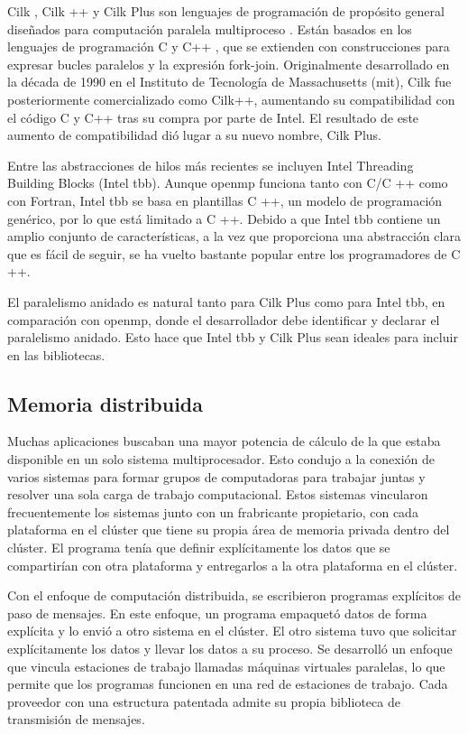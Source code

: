 Cilk \cite{robison2012cilk}, Cilk ++ y Cilk Plus \cite{blumofe1995cilk} son lenguajes de programación de propósito general diseñados para computación paralela multiproceso . Están basados en los lenguajes de programación C y C++ , que se extienden con construcciones para expresar bucles paralelos y la expresión fork-join. Originalmente desarrollado en la década de 1990 en el Instituto de Tecnología de Massachusetts (\acrshort{mit}), Cilk fue posteriormente comercializado como Cilk++, aumentando su compatibilidad con el código C y C++ tras su compra por parte de Intel. El resultado de este aumento de compatibilidad dió lugar a su nuevo nombre, Cilk Plus.

Entre las abstracciones de hilos más recientes se incluyen Intel Threading Building Blocks (Intel \acrshort{tbb})\cite{inteltbb2008}. Aunque \acrshort{openmp} funciona tanto con C/C ++ como con Fortran, Intel \acrshort{tbb} se basa en plantillas C ++, un modelo de programación genérico, por lo que está limitado a C ++. Debido a que Intel \acrshort{tbb} contiene un amplio conjunto de características, a la vez que proporciona una abstracción clara que es fácil de seguir, se ha vuelto bastante popular entre los programadores de C ++.

El paralelismo anidado es natural tanto para Cilk Plus como para Intel \acrshort{tbb}, en comparación con  \acrshort{openmp}, donde el desarrollador debe identificar y declarar el paralelismo anidado. Esto hace que Intel \acrshort{tbb} y Cilk Plus sean ideales para incluir en las bibliotecas.

\subsection{Memoria distribuida}
\label{sec:frameworks_memoria_distribuida}

Muchas aplicaciones buscaban una mayor potencia de cálculo de la que estaba disponible en un solo sistema multiprocesador. Esto condujo a la conexión de varios sistemas para formar grupos de computadoras para trabajar juntas y resolver una sola carga de trabajo computacional. Estos sistemas vincularon frecuentemente los sistemas junto con un frabricante propietario, con cada plataforma en el clúster que tiene su propia área de memoria privada dentro del clúster. El programa tenía que definir explícitamente los datos que se compartirían con otra plataforma y entregarlos a la otra plataforma en el clúster.

Con el enfoque de computación distribuida, se escribieron programas explícitos de paso de mensajes. En este enfoque, un programa empaquetó datos de forma explícita y lo envió a otro sistema en el clúster. El otro sistema tuvo que solicitar explícitamente los datos y llevar los datos a su proceso. Se desarrolló un enfoque que vincula estaciones de trabajo llamadas máquinas virtuales paralelas, lo que permite que los programas funcionen en una red de estaciones de trabajo. Cada proveedor con una estructura patentada admite su propia biblioteca de transmisión de mensajes.

